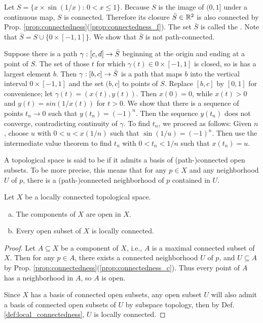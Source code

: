 \documentclass[11pt,a4paper]{article}
\begin{document}
\begin{example}
Let $S = \{x\times \sin{(1/x)}:\,0<x\le 1\}$. Because $S$ is the image of $(0,1]$ under a continuous map, $S$ is connected. Therefore its closure $\bar{S}\in \mathbb{R}^2$ is also connected by Prop. \ref{prop:connectedness}(\ref{prop:connectedness_f}). The set $\bar{S}$ is called the . Note that $\bar{S} = S\cup \{0\times [-1,1]\}$. We show that $\bar{S}$ is not path-connected. 

Suppose there is a path $\gamma:[c,d]\rightarrow \bar{S}$ beginning at the origin and ending at a point of $S$. The set of those $t$ for which $\gamma(t)\in 0\times[-1,1]$ is closed, so is has a largest element $b$. Then $\gamma:[b,c]\rightarrow \bar{S}$ is a path that maps $b$ into the vertical interval $0\times [-1,1]$ and the set $(b,c]$ to points of $S$. Replace $[b,c]$ by $[0,1]$ for convenience; let $\gamma(t) = (x(t),y(t))$. Then $x(0) = 0$, while $x(t)>0$ and $y(t) = sin(1/x(t))$ for $t>0$. We show that there is a sequence of points $t_n\rightarrow 0$ such that $y(t_n) = (-1)^n$. Then the sequence $y(t_n)$ does not converge, contradicting continuity of $\gamma$. To find $t_n$, we proceed as follows: Given $n$, choose $u$ with $0<u<x(1/n)$ such that $\sin{(1/u)}=(-1)^n$. Then use the intermediate value theorem to find $t_n$ with $0<t_n<1/n$ such that $x(t_n) = u$.
\end{example}

\begin{mydef}\label{def:local_connectedness}
A topological space is said to be  if it admits a basis of (path-)connected open subsets. To be more precise, this means that for any $p\in X$ and any neighborhood $U$ of $p$, there is a (path-)connected neighborhood of $p$ contained in $U$.
\end{mydef}

\begin{prop}
Let $X$ be a locally connected topological space.
\begin{enumerate}[(a)]
    \item The components of $X$ are open in $X$.
    \item Every open subset of $X$ is locally connected.
\end{enumerate}
\end{prop}

\begin{proof}
 Let $A\subseteq X$ be a component of $X$, i.e., $A$ is a maximal connected subset of $X$. Then for any $p\in A$, there exists a connected neighborhood $U$ of $p$, and $U\subseteq A$ by Prop. \ref{prop:connectedness}(\ref{prop:connectedness_c}). Thus every point of $A$ has a neighborhood in $A$, so $A$ is open.

 Since $X$ has a basis of connected open subsets, any open subset $U$ will also admit a basis of connected open subsets of $U$ by subspace topology, then by Def. \ref{def:local_connectedness}, $U$ is locally connected.
\end{proof}
\end{document}
